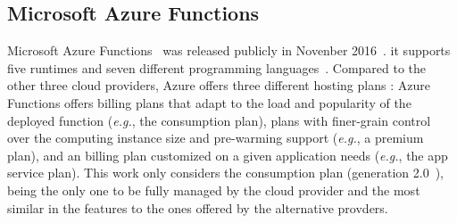 \subsection{Microsoft Azure Functions}\label{sec:ss:azure}

Microsoft Azure Functions~\cite{AzureFunctions} was released publicly in Novenber 2016~\cite{AzureFunctionsAnnouncement}. %
it supports five runtimes and seven different programming languages~\cite{AzureFunctionsLanguages}.
Compared to the other three cloud providers, Azure offers three different hosting plans \cite{AzureFunctionsPlans}:
Azure Functions offers billing plans that adapt to the load and popularity of the deployed function (\emph{e.g.}, the consumption plan), plans with finer-grain control over the computing instance size and pre-warming support (\emph{e.g.}, a premium plan), and an billing plan customized on a given application needs (\emph{e.g.}, the app service plan). 
This work only considers the consumption plan (generation 2.0~\cite{AzureFunctionsGenerations}), being the only one to be fully managed by the cloud provider and the most similar in the features to the ones offered by the alternative provders. 

